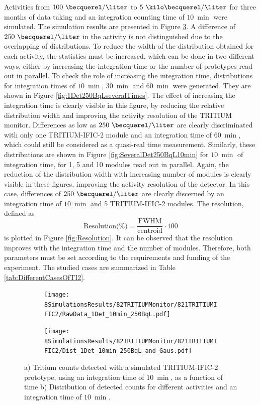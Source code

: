 Activities from $100~\becquerel/\liter$ to $5~\kilo\becquerel/\liter$ for three months of data taking and an integration counting time of $10~\min$ were simulated. The simulation results are presented in Figure \ref{fig:1Det10Min250BqL}. A difference of $250~\becquerel/\liter$ in the activity is not distinguished due to the overlapping of distributions. To reduce the width of the distribution obtained for each activity, the statistics must be increased, which can be done in two different ways, either by increasing the integration time or the number of prototypes read out in parallel. To check the role of increasing the integration time, distributions for integration times of $10~\min$, $30~\min$ and $60~\min$ were generated. They are shown in Figure \ref{fig:1Det250BqLseveralTimes}. The effect of increasing the integration time is clearly visible in this figure, by reducing the relative distribution width and improving the activity resolution of the TRITIUM monitor. Differences as low as $250~\becquerel/\liter$ are clearly discriminated with only one TRITIUM-IFIC-2 module and an integration time of $60~\min$, which could still be considered as a quasi-real time measurement. Similarly, these distributions are shown in Figure \ref{fig:SeveralDet250BqL10min} for $10~\min$ of integration time, for 1, 5 and 10 modules read out in parallel. Again, the reduction of the distribution width with increasing number of modules is clearly visible in these figures, improving the activity resolution of the detector. In this case, differences of $250~\becquerel/\liter$ are clearly discerned by an integration time of $10~\min$ and 5 TRITIUM-IFIC-2 modules. The resolution, defined as
\begin{equation}
\text{Resolution(\%)}=\frac{\text{FWHM}}{\text{centroid}}\cdot{}100
\label{eq:Resolution}
\end{equation}
is plotted in Figure \ref{fig:Resolution}. It can be observed that the resolution improves with the integration time and the number of modules. Therefore, both parameters must be set according to the requirements and funding of the experiment. The studied cases are summarized in Table \ref{tab:DifferentCasesOfTI2}.


\begin{figure}
\centering
    \begin{subfigure}[b]{0.7\textwidth}
    \centering
    \texttt{[image: 8SimulationsResults/82TRITIUMMonitor/821TRITIUMIFIC2/RawData\_1Det\_10min\_250BqL.pdf]}  
    \caption{\label{subfig:RawData1Det10Min250BqL}}
    \end{subfigure}
    \hfill
    \begin{subfigure}[b]{0.7\textwidth}
    \centering
    \texttt{[image: 8SimulationsResults/82TRITIUMMonitor/821TRITIUMIFIC2/Dist\_1Det\_10min\_250BqL\_and\_Gaus.pdf]}  
    \caption{\label{subfig:Dist1Det10Min250BqL}}
    \end{subfigure}
 \caption{a) Tritium counts detected with a simulated TRITIUM-IFIC-2 prototype, using an integration time of $10~\min$, as a function of time b) Distribution of detected counts for different activities and an integration time of $10~\min$.}
 \label{fig:1Det10Min250BqL}
\end{figure}

